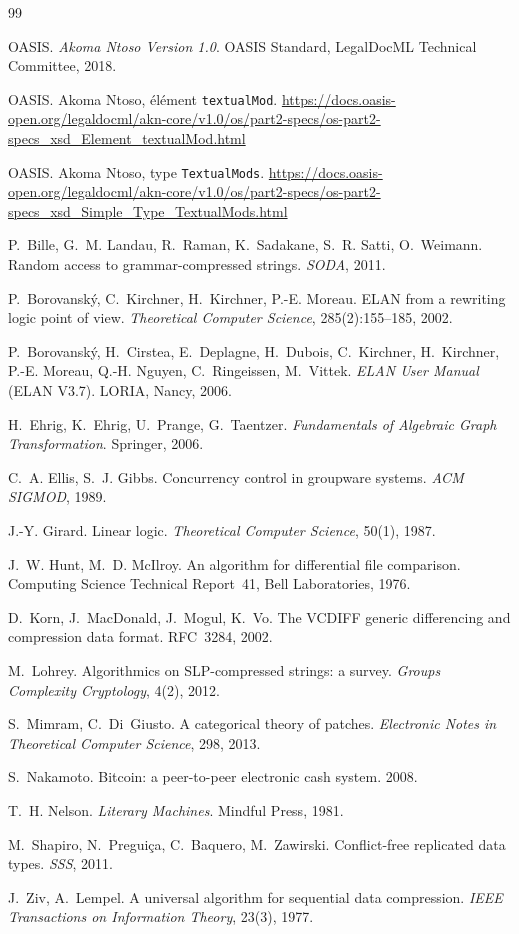 \documentclass[11pt,a4paper]{article}
\begin{document}
\begin{thebibliography}{99}

OASIS. \emph{Akoma Ntoso Version 1.0}. OASIS Standard, LegalDocML Technical Committee, 2018.

OASIS. Akoma Ntoso, élément \texttt{textualMod}. \url{https://docs.oasis-open.org/legaldocml/akn-core/v1.0/os/part2-specs/os-part2-specs_xsd_Element_textualMod.html}

OASIS. Akoma Ntoso, type \texttt{TextualMods}. \url{https://docs.oasis-open.org/legaldocml/akn-core/v1.0/os/part2-specs/os-part2-specs_xsd_Simple_Type_TextualMods.html}

P.~Bille, G.~M. Landau, R.~Raman, K.~Sadakane, S.~R. Satti, O.~Weimann. Random access to grammar-compressed strings. \emph{SODA}, 2011.

P.~Borovanský, C.~Kirchner, H.~Kirchner, P.-E. Moreau. ELAN from a rewriting logic point of view. \emph{Theoretical Computer Science}, 285(2):155--185, 2002.

P.~Borovanský, H.~Cirstea, E.~Deplagne, H.~Dubois, C.~Kirchner, H.~Kirchner, P.-E. Moreau, Q.-H. Nguyen, C.~Ringeissen, M.~Vittek. \emph{ELAN User Manual} (ELAN V3.7). LORIA, Nancy, 2006.

H.~Ehrig, K.~Ehrig, U.~Prange, G.~Taentzer. \emph{Fundamentals of Algebraic Graph Transformation}. Springer, 2006.

C.~A. Ellis, S.~J. Gibbs. Concurrency control in groupware systems. \emph{ACM SIGMOD}, 1989.

J.-Y. Girard. Linear logic. \emph{Theoretical Computer Science}, 50(1), 1987.

J.~W. Hunt, M.~D. McIlroy. An algorithm for differential file comparison. Computing Science Technical Report~41, Bell Laboratories, 1976.

D.~Korn, J.~MacDonald, J.~Mogul, K.~Vo. The VCDIFF generic differencing and compression data format. RFC~3284, 2002.

M.~Lohrey. Algorithmics on SLP-compressed strings: a survey. \emph{Groups Complexity Cryptology}, 4(2), 2012.

S.~Mimram, C.~Di~Giusto. A categorical theory of patches. \emph{Electronic Notes in Theoretical Computer Science}, 298, 2013.

S.~Nakamoto. Bitcoin: a peer-to-peer electronic cash system. 2008.

T.~H. Nelson. \emph{Literary Machines}. Mindful Press, 1981.

M.~Shapiro, N.~Preguiça, C.~Baquero, M.~Zawirski. Conflict-free replicated data types. \emph{SSS}, 2011.

J.~Ziv, A.~Lempel. A universal algorithm for sequential data compression. \emph{IEEE Transactions on Information Theory}, 23(3), 1977.

\end{thebibliography}
\end{document}
